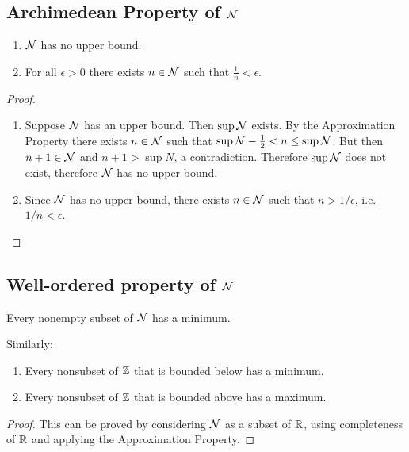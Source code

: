 \subsection{Archimedean Property of $\mathcal{N}$}
\begin{theorem*}
  \begin{enumerate}
  \item $\mathcal{N}$ has no upper bound.
  \item For all $\epsilon > 0$ there exists $n \in \mathcal{N}$ such that $\frac{1}{n} < \epsilon$.
  \end{enumerate}
\end{theorem*}
\begin{proof}\hspace{0pt}
  \begin{enumerate}
  \item Suppose $\mathcal{N}$ has an upper bound. Then $\sup \mathcal{N}$ exists. By the Approximation Property
    there exists $n \in \mathcal{N}$ such that $\sup \mathcal{N} - \frac{1}{2} < n \leq \sup \mathcal{N}$. But then
    $n + 1 \in \mathcal{N}$ and $n + 1 > \sup N$, a contradiction. Therefore $\sup \mathcal{N}$ does not exist,
    therefore $\mathcal{N}$ has no upper bound.
  \item Since $\mathcal{N}$ has no upper bound, there exists $n \in \mathcal{N}$ such that $n > 1/\epsilon$,
    i.e. $1/n < \epsilon$.
  \end{enumerate}
\end{proof}

\subsection{Well-ordered property of $\mathcal{N}$}
\begin{theorem*}\hspace{0pt}
  Every nonempty subset of $\mathcal{N}$ has a minimum.
\end{theorem*}

\begin{remark*}
  Similarly:
  \begin{enumerate}
    \item Every nonsubset of $\mathbb{Z}$ that is bounded below has a minimum.
    \item Every nonsubset of $\mathbb{Z}$ that is bounded above has a maximum.
  \end{enumerate}
\end{remark*}

\begin{proof}
  This can be proved by considering $\mathcal{N}$ as a subset of $\mathbb{R}$, using completeness of $\mathbb{R}$ and
  applying the Approximation Property.
\end{proof}

